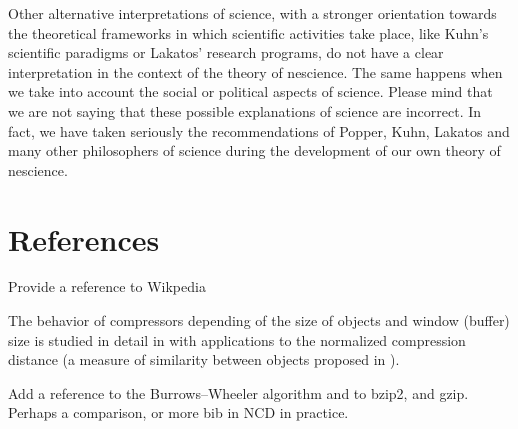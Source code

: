 Other alternative interpretations of science, with a stronger orientation towards the theoretical frameworks in which scientific activities take place, like Kuhn's scientific paradigms or Lakatos' research programs, do not have a clear interpretation in the context of the theory of nescience. The same happens when we take into account the social or political aspects of science. Please mind that we are not saying that these possible explanations of science are incorrect. In fact, we have taken seriously the recommendations of Popper, Kuhn, Lakatos and many other philosophers of science during the development of our own theory of nescience.


%
%
\section*{References}

{\color{red} Provide a reference to Wikpedia}

The behavior of compressors depending of the size of objects and window (buffer) size is studied in detail in \cite{cebrian2005common} with applications to the normalized compression distance (a measure of similarity between objects proposed in \cite{li2004similarity}).

Add a reference to the Burrows–Wheeler algorithm and to bzip2, and gzip. Perhaps a comparison, or more bib in NCD in practice.


